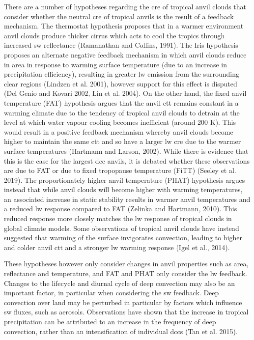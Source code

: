 There are a number of hypotheses regarding the \acrshort{cre} of tropical anvil
clouds that consider whether the neutral \acrshort{cre} of tropical anvils is the
result of a feedback mechanism. The thermostat hypothesis proposes that
in a warmer environment anvil clouds produce thicker cirrus which acts
to cool the tropics through increased \acrshort{sw} reflectance (Ramanathan and
Collins, 1991). The Iris hypothesis proposes an alternate negative
feedback mechanism in which anvil clouds reduce in area in response to
warming surface temperature (due to an increase in precipitation
efficiency), resulting in greater \acrshort{lw} emission from the surrounding clear
regions (Lindzen et al. 2001), however support for this effect is
disputed (Del Genio and Kovari 2002, Lin et al. 2004). On the other
hand, the fixed anvil temperature (FAT) hypothesis argues that the anvil
\acrshort{ctt} remains constant in a warming climate due to the
tendency of tropical anvil clouds to detrain at the level at which water
vapour cooling becomes inefficient (around 200 K). This would result in
a positive feedback mechanism whereby anvil clouds become higher to
maintain the same \acrshort{ctt} and so have a larger \acrshort{lw} \acrshort{cre} due
to the warmer surface temperatures (Hartmann and Larson, 2002). While
there is evidence that this is the case for the largest \acrshort{dcc} anvils, it
is debated whether these observations are due to FAT or due to fixed
tropopause temperature (FiTT) (Seeley et al. 2019). The proportionately
higher anvil temperature (PHAT) hypothesis argues instead that while
anvil clouds will become higher with warming temperatures, an associated
increase in static stability results in warmer anvil temperatures and a
reduced \acrshort{lw} response compared to FAT (Zelinka and Hartmann, 2010). This
reduced response more closely matches the \acrshort{lw} response of tropical clouds
in global climate models. Some observations of tropical anvil clouds
have instead suggested that warming of the surface invigorates
convection, leading to higher and colder anvil \acrshort{ctt} and a stronger \acrshort{lw}
warming response (Igel et al., 2014).

These hypotheses however only consider changes in anvil properties such
as area, reflectance and temperature, and FAT and PHAT only consider the
\acrshort{lw} feedback. Changes to the lifecycle and diurnal cycle of deep
convection may also be an important factor, in particular when
considering the \acrshort{sw} feedback. Deep convection over land may be perturbed
in particular by factors which influence \acrshort{sw} fluxes, such as aerosols.
Observations have shown that the increase in tropical precipitation can
be attributed to an increase in the frequency of deep convection, rather
than an intensification of individual \acrshort{dcc}s (Tan et al. 2015).

